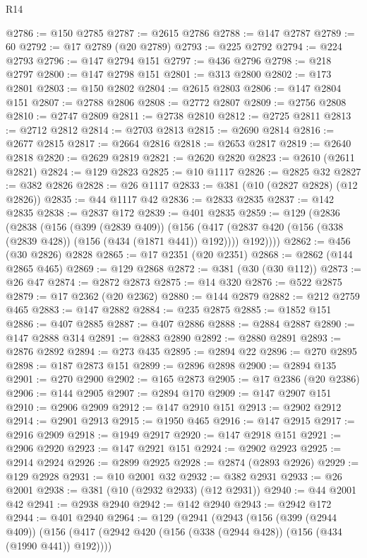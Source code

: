 \begin{lexlean}{R14}
\begin{coremodule}
@2786 := @150 @2785
@2787 := @2615 @2786
@2788 := @147 @2787
@2789 := 60
@2792 := @17 @2789 (@20 @2789)
@2793 := @225 @2792
@2794 := @224 @2793
@2796 := @147 @2794 @151
@2797 := @436 @2796
@2798 := @218 @2797
@2800 := @147 @2798 @151
@2801 := @313 @2800
@2802 := @173 @2801
@2803 := @150 @2802
@2804 := @2615 @2803
@2806 := @147 @2804 @151
@2807 := @2788 @2806
@2808 := @2772 @2807
@2809 := @2756 @2808
@2810 := @2747 @2809
@2811 := @2738 @2810
@2812 := @2725 @2811
@2813 := @2712 @2812
@2814 := @2703 @2813
@2815 := @2690 @2814
@2816 := @2677 @2815
@2817 := @2664 @2816
@2818 := @2653 @2817
@2819 := @2640 @2818
@2820 := @2629 @2819
@2821 := @2620 @2820
@2823 := @2610 (@2611 @2821)
@2824 := @129 @2823
@2825 := @10 @1117
@2826 := @2825 @32
@2827 := @382 @2826
@2828 := @26 @1117
@2833 := @381 (@10 (@2827 @2828) (@12 @2826))
@2835 := @44 @1117 @42
@2836 := @2833 @2835
@2837 := @142 @2835
@2838 := @2837 @172
@2839 := @401 @2835
@2859 := @129
    (@2836
      (@2838
        (@156
          (@399 (@2839 @409))
          (@156
            (@417 (@2837 @420 (@156 (@338 (@2839 @428)) (@156 (@434 (@1871 @441)) @192))))
            @192))))
@2862 := @456 (@30 @2826) @2828
@2865 := @17 @2351 (@20 @2351)
@2868 := @2862 (@144 @2865 @465)
@2869 := @129 @2868
@2872 := @381 (@30 (@30 @112))
@2873 := @26 @47
@2874 := @2872 @2873
@2875 := @14 @320
@2876 := @522 @2875
@2879 := @17 @2362 (@20 @2362)
@2880 := @144 @2879
@2882 := @212 @2759 @465
@2883 := @147 @2882
@2884 := @235 @2875
@2885 := @1852 @151
@2886 := @407 @2885
@2887 := @407 @2886
@2888 := @2884 @2887
@2890 := @147 @2888 @314
@2891 := @2883 @2890
@2892 := @2880 @2891
@2893 := @2876 @2892
@2894 := @273 @435
@2895 := @2894 @22
@2896 := @270 @2895
@2898 := @187 @2873 @151
@2899 := @2896 @2898
@2900 := @2894 @135
@2901 := @270 @2900
@2902 := @165 @2873
@2905 := @17 @2386 (@20 @2386)
@2906 := @144 @2905
@2907 := @2894 @170
@2909 := @147 @2907 @151
@2910 := @2906 @2909
@2912 := @147 @2910 @151
@2913 := @2902 @2912
@2914 := @2901 @2913
@2915 := @1950 @465
@2916 := @147 @2915
@2917 := @2916 @2909
@2918 := @1949 @2917
@2920 := @147 @2918 @151
@2921 := @2906 @2920
@2923 := @147 @2921 @151
@2924 := @2902 @2923
@2925 := @2914 @2924
@2926 := @2899 @2925
@2928 := @2874 (@2893 @2926)
@2929 := @129 @2928
@2931 := @10 @2001 @32
@2932 := @382 @2931
@2933 := @26 @2001
@2938 := @381 (@10 (@2932 @2933) (@12 @2931))
@2940 := @44 @2001 @42
@2941 := @2938 @2940
@2942 := @142 @2940
@2943 := @2942 @172
@2944 := @401 @2940
@2964 := @129
    (@2941
      (@2943
        (@156
          (@399 (@2944 @409))
          (@156
            (@417 (@2942 @420 (@156 (@338 (@2944 @428)) (@156 (@434 (@1990 @441)) @192))))

\end{coremodule}
\end{lexlean}

